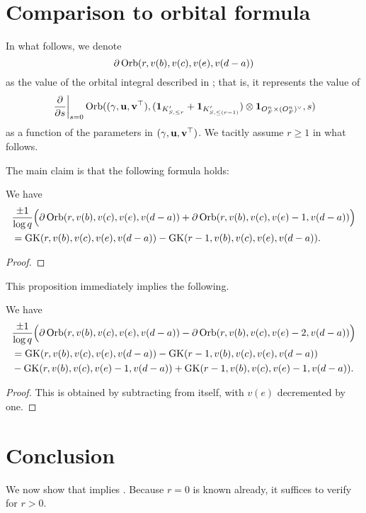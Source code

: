 \section{Comparison to orbital formula}
In what follows, we denote
\[ \partial\operatorname{Orb}(r, v(b), v(c), v(e), v(d-a)) \]
as the value of the orbital integral described in ; that is,
it represents the value of
\[ \left. \pdv{}{s} \right\rvert_{s=0}
  \operatorname{Orb}({(\gamma, \mathbf u, \mathbf v^\top)}, (\mathbf{1}_{K'_{S, \le r}} + \mathbf{1}_{K'_{S, \le (r-1)}}) \otimes \mathbf{1}_{O_F^n \times (O_F^n)^\vee}, s) \]
as a function of the parameters in ${(\gamma, \mathbf u, \mathbf v^\top)}$.
We tacitly assume $r \ge 1$ in what follows.

The main claim is that the following formula holds:
\begin{proposition}
  \label{prop:finale_by_one}
  We have
  \begin{align*}
    &\frac{\pm1}{\log q}\Big(\partial\operatorname{Orb}(r, v(b), v(c), v(e), v(d-a))
      + \partial\operatorname{Orb}(r, v(b), v(c), v(e)-1, v(d-a))\Big) \\
    &= \operatorname{GK}(r, v(b), v(c), v(e), v(d-a)) - \operatorname{GK}(r-1, v(b), v(c), v(e), v(d-a)).
  \end{align*}
\end{proposition}
\begin{proof}
\end{proof}

This proposition immediately implies the following.
\begin{corollary}
  \label{cor:finale_by_two}
  We have
  \begin{align*}
    &\frac{\pm1}{\log q}\Big(\partial\operatorname{Orb}(r, v(b), v(c), v(e), v(d-a)) - \partial\operatorname{Orb}(r, v(b), v(c), v(e)-2, v(d-a))\Big) \\
    &= \operatorname{GK}(r, v(b), v(c), v(e), v(d-a)) - \operatorname{GK}(r-1, v(b), v(c), v(e), v(d-a)) \\
    &- \operatorname{GK}(r, v(b), v(c), v(e)-1, v(d-a)) + \operatorname{GK}(r-1, v(b), v(c), v(e)-1, v(d-a)).
  \end{align*}
\end{corollary}
\begin{proof}
  This is obtained by subtracting  from itself,
  with $v(e)$ decremented by one.
\end{proof}

\section{Conclusion}
We now show that  implies .
Because $r = 0$ is known already, it suffices to verify for $r > 0$.

